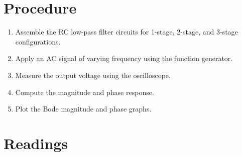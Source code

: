 \documentclass[a4paper,12pt]{article}
\begin{document}
\section*{Procedure}
\begin{enumerate}
    \item Assemble the RC low-pass filter circuits for 1-stage, 2-stage, and 3-stage configurations.
    \item Apply an AC signal of varying frequency using the function generator.
    \item Measure the output voltage using the oscilloscope.
    \item Compute the magnitude and phase response.
    \item Plot the Bode magnitude and phase graphs.
\end{enumerate}
\section*{Readings}
\end{document}
